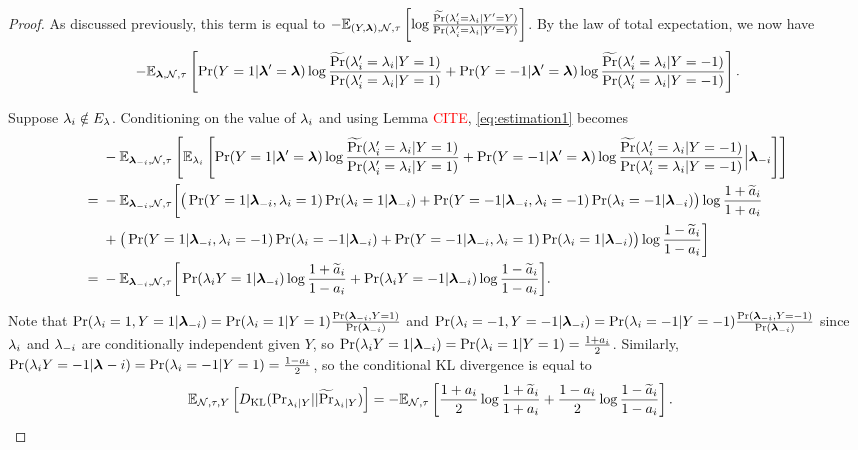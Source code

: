 \begin{proof}

As discussed previously, this term is equal to $-\mathbb{E}_{(Y, \bm{\lambda}), \mathcal{N}, \tau}\left[\log \frac{\widetilde{\Pr}(\lambda_i' = \lambda_i | Y' = Y)}{\Pr(\lambda_i' = \lambda_i | Y' = Y)}\right]$. By the law of total expectation, we now have
\begin{align}
    -\mathbb{E}_{\bm{\lambda}, \mathcal{N}, \tau}\left[ \Pr(Y = 1 | \bm{\lambda}' = \bm{\lambda}) \log \frac{\widetilde{\Pr}(\lambda_i' = \lambda_i | Y = 1)}{\Pr(\lambda_i' = \lambda_i | Y = 1)} +  \Pr(Y = -1 | \bm{\lambda}' = \bm{\lambda}) \log \frac{\widetilde{\Pr}(\lambda_i' = \lambda_i | Y = -1)}{\Pr(\lambda_i' = \lambda_i | Y = -1)}\right].
    \label{eq:estimation1}
\end{align}

Suppose $\lambda_i \notin E_{\lambda}$. Conditioning on the value of $\lambda_i$ and using Lemma \textcolor{red}{CITE}, \eqref{eq:estimation1} becomes 
\begin{align*}
&-\mathbb{E}_{\bm{\lambda}_{-i}, \mathcal{N}, \tau}\left[\mathbb{E}_{\lambda_i}\left[\Pr(Y = 1 | \bm{\lambda}' = \bm{\lambda}) \log \frac{\widetilde{\Pr}(\lambda_i' = \lambda_i | Y = 1)}{\Pr(\lambda_i' = \lambda_i | Y = 1) }  + \Pr(Y = -1 | \bm{\lambda}' = \bm{\lambda}) \log \frac{\widetilde{\Pr}(\lambda_i' = \lambda_i | Y = -1)}{\Pr(\lambda_i' = \lambda_i | Y = -1)} \Big| \bm{\lambda}_{-i}\right]\right] \\
= \;&-\mathbb{E}_{\bm{\lambda}_{-i}, \mathcal{N}, \tau}\bigg[\big(\Pr(Y = 1 | \bm{\lambda}_{-i}, \lambda_i = 1) \Pr(\lambda_i = 1 | \bm{\lambda}_{-i}) + \Pr(Y = -1 | \bm{\lambda}_{-i}, \lambda_i = -1) \Pr(\lambda_i = -1 | \bm{\lambda}_{-i}) \big)\log \frac{1 + \widetilde{a}_i}{1 + a_i} \\
&+  \big(\Pr(Y = 1 | \bm{\lambda}_{-i}, \lambda_i = -1) \Pr(\lambda_i = -1 | \bm{\lambda}_{-i}) + \Pr(Y = -1 | \bm{\lambda}_{-i}, \lambda_i = 1) \Pr(\lambda_i = 1 | \bm{\lambda}_{-i})  \big)\log \frac{1 - \widetilde{a}_i}{1 - a_i} \bigg] \\
= \;& -\mathbb{E}_{\bm{\lambda}_{-i}, \mathcal{N}, \tau}\bigg[\Pr(\lambda_i Y = 1 | \bm{\lambda}_{-i}) \log \frac{1 + \widetilde{a}_i}{1 - a_i} + \Pr(\lambda_i Y = -1 | \bm{\lambda}_{-i})\log \frac{1 - \widetilde{a}_i}{1 - a_i} \bigg].
\end{align*}

Note that $\Pr(\lambda_i = 1, Y = 1 | \bm{\lambda}_{-i}) = \Pr(\lambda_i = 1 | Y = 1)  \frac{\Pr(\bm{\lambda}_{-i}, Y = 1)}{\Pr(\bm{\lambda}_{-i})}$ and $\Pr(\lambda_i = -1, Y = -1 | \bm{\lambda}_{-i}) = \Pr(\lambda_i = -1 | Y = -1) \frac{ \Pr(\bm{\lambda}_{-i}, Y = -1)}{\Pr(\bm{\lambda}_{-i})}$ since $\lambda_i$ and $\lambda_{-i}$ are conditionally independent given $Y$, so $\Pr(\lambda_i Y = 1 | \bm{\lambda}_{-i}) = \Pr(\lambda_i = 1| Y = 1) = \frac{1 + a_i}{2}$. Similarly, $\Pr(\lambda_i Y = -1 | \bm{\lambda}_{}-i) = \Pr(\lambda_i = -1 | Y = 1) = \frac{1 - a_i}{2}$, so the conditional KL divergence is equal to 
\begin{align}
\mathbb{E}_{\mathcal{N}, \tau, Y}\left[D_{\mathrm{KL}} (\mathrm{Pr}_{\lambda_i | Y} || \widetilde{\Pr}_{\lambda_i | Y} )\right] =-&\mathbb{E}_{\mathcal{N}, \tau}\left[\frac{1 + a_i}{2} \log \frac{1 + \widetilde{a}_i}{1 + a_i} + \frac{1 - a_i}{2} \log \frac{1 - \widetilde{a}_i}{1 - a_i}\right]. \label{eq:estimation2}
\end{align}


\end{proof}
